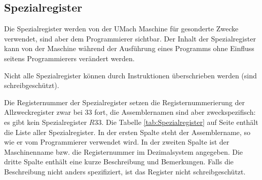 \subsection{Spezialregister}
\label{subsec:Spezialregister}
Die Spezialregister werden von der UMach Maschine für gesonderte Zwecke
verwendet, sind aber dem Programmierer sichtbar. Der Inhalt der Spezialregister
kann von der Maschine während der Ausführung eines Programms ohne Einfluss
seitens Programmierers verändert werden.

Nicht alle Spezialregister können durch Instruktionen überschrieben werden
(sind schreibgeschützt).

Die Registernummer der Spezialregister setzen die Registernummerierung
der Allzweckregister zwar bei 33 fort, die Assemblernamen sind aber
zweckspezifisch: es gibt kein Spezialregister $R33$.
Die Tabelle \ref{tab:Spezialregister} auf Seite \pageref{tab:Spezialregister}
enthält die Liste aller Spezialregister. In der ersten
Spalte steht der Assemblername, so wie er vom Programmierer verwendet wird. In
der zweiten Spalte ist der Maschinenname bzw. die Registernummer im
Dezimalsystem angegeben.
Die dritte Spalte enthält eine kurze Beschreibung und Bemerkungen.
Falls die Beschreibung nicht anders spezifiziert, ist das Register nicht
schreibgeschützt.

